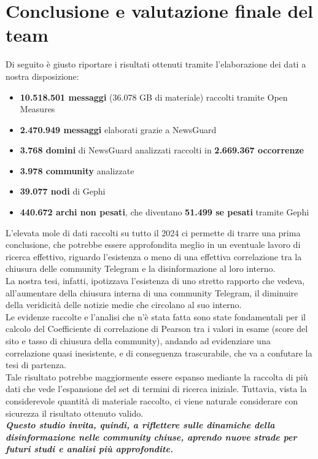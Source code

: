 \documentclass[12pt]{article}
\begin{document}
	\section{Conclusione e valutazione finale del team}
	Di seguito è giusto riportare i risultati ottenuti tramite l'elaborazione dei dati a nostra disposizione:\\
	\begin{itemize}[label=]
		\item \textbf{10.518.501 messaggi} (36.078 GB di materiale) raccolti tramite Open Measures
		\item \textbf{2.470.949 messaggi} elaborati grazie a NewsGuard
		\item \textbf{3.768 domini} di NewsGuard analizzati raccolti in \textbf{2.669.367 occorrenze}
		\item \textbf{3.978 community} analizzate
		\item \textbf{39.077 nodi} di Gephi
		\item \textbf{440.672 archi non pesati}, che diventano \textbf{51.499 se pesati} tramite Gephi
	\end{itemize}
	L'elevata mole di dati raccolti su tutto il 2024 ci permette di trarre una prima conclusione, che potrebbe essere approfondita meglio in un eventuale lavoro di ricerca effettivo, riguardo l'esistenza o meno di una effettiva correlazione tra la chiusura delle community Telegram e la disinformazione al loro interno.\\
	La nostra tesi, infatti, ipotizzava l'esistenza di uno stretto rapporto che vedeva, all'aumentare della chiusura interna di una community Telegram, il diminuire della veridicità delle notizie medie che circolano al suo interno.\\
	Le evidenze raccolte e l'analisi che n'è stata fatta sono state fondamentali per il calcolo del Coefficiente di correlazione di Pearson tra i valori in esame (score del sito e tasso di chiusura della community), andando ad evidenziare una correlazione quasi inesistente, e di conseguenza trascurabile, che va a confutare la tesi di partenza.\\
	Tale risultato potrebbe maggiormente essere espanso mediante la raccolta di più dati che vede l'espansione del set di termini di ricerca iniziale. Tuttavia, vista la considerevole quantità di materiale raccolto, ci viene naturale considerare con sicurezza il risultato ottenuto valido.\\
	\textbf{\textit{Questo studio invita, quindi, a riflettere sulle dinamiche della disinformazione nelle community chiuse, aprendo nuove strade per futuri studi e analisi più approfondite.}}
	\newpage
\end{document}

